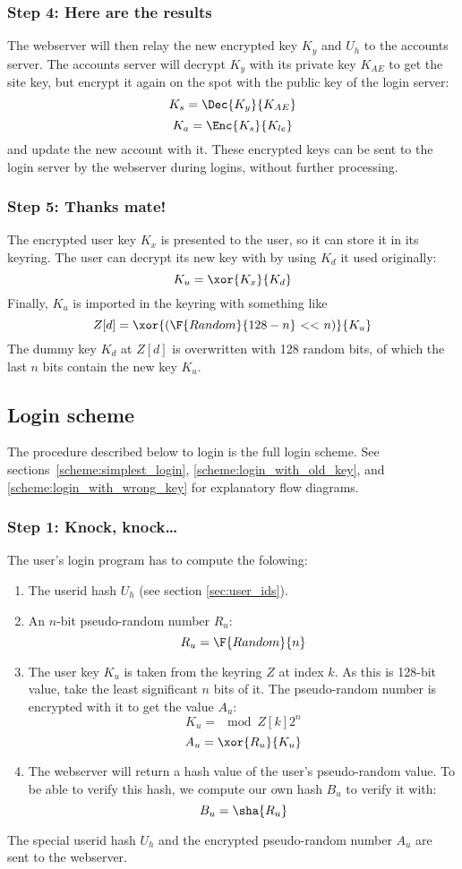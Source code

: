 \subsubsection{Step 4: Here are the results}
\label{sec:apply_step4}
The webserver will then relay the new encrypted key $K_y$ and $U_h$ to the accounts server.
The accounts server will decrypt $K_y$ with its private key $K_{AE}$ to get the site key,
but encrypt it again on the spot with the public key of the login server:
\[K_s=\Dec{K_y}{K_{AE}}\]
\[K_a=\Enc{K_s}{K_{le}}\]
and update the new account with it.
These encrypted keys can be sent to the login server by the webserver during logins,
without further processing.

\subsubsection{Step 5: Thanks mate!}
\label{sec:apply_step5}
The encrypted user key $K_x$ is presented to the user,
so it can store it in its keyring.
The user can decrypt its new key with by using $K_d$ it used originally:
\[K_u=\xor{K_x}{K_d}\]
Finally, $K_u$ is imported in the keyring with something like
\[Z[d]=\xor{(\F{Random}{128-n}\ \mathbf{<<}\ n)}{K_u}\]
The dummy key $K_d$ at $Z[d]$ is overwritten with 128 random bits,
of which the last $n$ bits contain the new key $K_u$.

\subsection{Login scheme}
\label{sec:full_login}
The procedure described below to login is the full login scheme.
See sections~\vref{scheme:simplest_login},
\vref{scheme:login_with_old_key},
and \vref{scheme:login_with_wrong_key} for explanatory flow diagrams.

\subsubsection{Step 1: Knock, knock\ldots}
\label{sec:login_step1}
The user's login program has to compute the folowing:
\begin{enumerate}
\item The userid hash $U_h$ (see section \ref{sec:user_ids}).
\item An $n$-bit pseudo-random number $R_u$:
\[R_u=\F{Random}{n}\]
\item The user key $K_u$ is taken from the keyring $Z$ at index $k$.
As this is 128-bit value,
take the least significant $n$ bits of it.
The pseudo-random number is encrypted with it to get the value $A_u$:
\[K_u=\mod{Z[k]}{2^n}\]
\[A_u=\xor{R_u}{K_u}\]
\item The webserver will return a hash value of the user's pseudo-random value.
To be able to verify this hash,
we compute our own hash $B_u$ to verify it with:
\[B_u=\sha{R_u}\]
\end{enumerate}
The special userid hash $U_h$ and the encrypted pseudo-random number $A_u$ are sent to the webserver.

